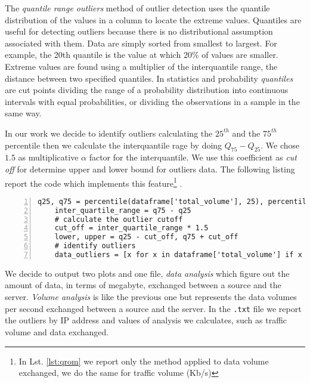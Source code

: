 The \textit{quantile range outliers} method of outlier detection uses the quantile distribution of the values in a column to locate the extreme values. Quantiles are useful for detecting outliers because there is no distributional assumption associated with them. Data are simply sorted from smallest to largest. For example, the 20th quantile is the value at which 20\% of values are smaller. Extreme values are found using a multiplier of the interquantile range, the distance between two specified quantiles.
In statistics and probability \textit{quantiles} are cut points dividing the range of a probability distribution into continuous intervals with equal probabilities, or dividing the observations in a sample in the same way. 

In our work we decide to identify outliers calculating the $25^{th}$ and the $75^{th}$ percentile then we calculate the interquantile rage by doing $Q_{75}-Q_{25}$. We chose $1.5$ as multiplicative $\alpha$ factor for the interquantile. 
We use this coefficient as \textit{cut off} for determine upper and lower bound for outliers data. 
The following listing report the code which implements this feature\footnote{In Lst. \ref{lst:qrom} we report only the method applied to data volume exchanged, we do the same for traffic volume (Kb/s)} .
 
 \begin{lstlisting}[numbers=left, columns=flexible, breaklines=true, frame=tb, caption={quantile range outliers method}, label={lst:qrom}]
    q25, q75 = percentile(dataframe['total_volume'], 25), percentile(dataframe['total_volume'], 75)
    inter_quartile_range = q75 - q25
    # calculate the outlier cutoff
    cut_off = inter_quartile_range * 1.5
    lower, upper = q25 - cut_off, q75 + cut_off
    # identify outliers
    data_outliers = [x for x in dataframe['total_volume'] if x < lower or x > upper]
\end{lstlisting}

We decide to output two plots and one file, \textit{data analysis} which figure out the amount of data, in terms of megabyte, exchanged between a source and the server. \textit{Volume analysis} is like the previous one but represents the data volumes per second exchanged between a source and the server. In the \texttt{.txt} file we report the outliers by IP address and values of analysis we calculates, such as traffic volume and data exchanged.
\bigskip
